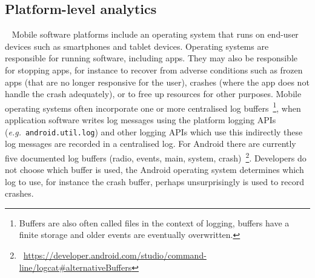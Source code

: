 \subsection{Platform-level analytics}~\label{platform-level-analytics}
Mobile software platforms include an operating system that runs on end-user devices such as smartphones and tablet devices. Operating systems are responsible for running software, including apps. They may also be responsible for stopping apps, for instance to recover from adverse conditions such as frozen apps (that are no longer responsive for the user), crashes (where the app does not handle the crash adequately), or to free up resources for other purposes. Mobile operating systems often incorporate one or more centralised log buffers~\footnote{Buffers are also often called files in the context of logging, buffers have a finite storage and older events are eventually overwritten.}, when application software writes log messages %
using the platform logging APIs (\emph{e.g.}~\texttt{android.util.log}) and other logging APIs which use this indirectly these log messages are recorded in a centralised log. For Android there are currently five documented log buffers (radio, events, main, system, crash)~\footnote{~\url{https://developer.android.com/studio/command-line/logcat\#alternativeBuffers}}. Developers do not choose which buffer is used, the Android operating system determines which log to use, for instance the crash buffer, perhaps unsurprisingly is used to record crashes.

